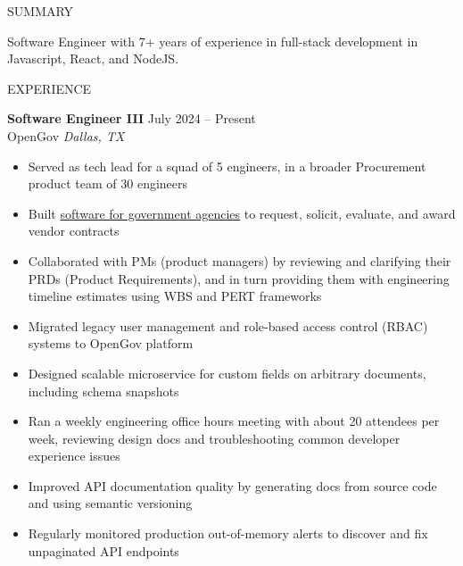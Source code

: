 \documentclass{resume} %
\begin{document}
\begin{rSection}{SUMMARY}

	{Software Engineer with 7+ years of experience in full-stack development in Javascript, React, and NodeJS.}

\end{rSection}


\begin{rSection}{EXPERIENCE}

	\textbf{Software Engineer III} \hfill July 2024 -- Present\\
	OpenGov \hfill \textit{Dallas, TX}
	\begin{itemize}
		\itemsep -3pt {}
        \item Served as tech lead for a squad of 5 engineers, in a broader Procurement product team of 30 engineers
        \item Built \href{https://procurement.opengov.com/portal/seattle}{software for government agencies} to request, solicit, evaluate, and award vendor contracts
        \item Collaborated with PMs (product managers) by reviewing and clarifying their PRDs (Product Requirements), and in turn providing them with engineering timeline estimates using WBS and PERT frameworks
		\item Migrated legacy user management and role-based access control (RBAC) systems to OpenGov platform
        \item Designed scalable microservice for custom fields on arbitrary documents, including schema snapshots
		\item Ran a weekly engineering office hours meeting with about 20 attendees per week, reviewing design docs and troubleshooting common developer experience issues
        \item Improved API documentation quality by generating docs from source code and using semantic versioning
        \item Regularly monitored production out-of-memory alerts to discover and fix unpaginated API endpoints
	\end{itemize}


\end{rSection}
\end{document}
